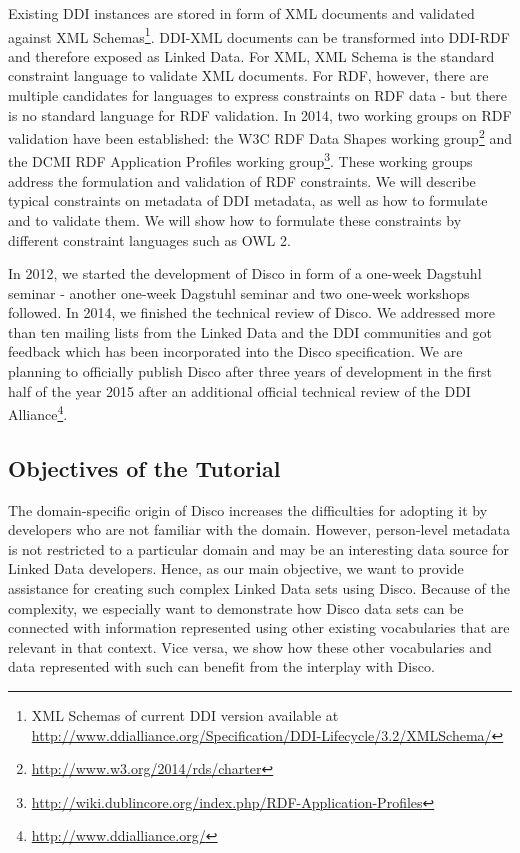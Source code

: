 \documentclass{llncs}
\begin{document}
Existing DDI instances are stored in form of XML documents and validated against XML Schemas\footnote{XML Schemas of current DDI version available at \url{http://www.ddialliance.org/Specification/DDI-Lifecycle/3.2/XMLSchema/}}.
DDI-XML documents can be transformed into DDI-RDF and therefore exposed as Linked Data.
For XML, XML Schema is the standard constraint language to validate XML documents.
For RDF, however, there are multiple candidates for languages to express constraints on RDF data - but there is no standard language for RDF validation.
In 2014, two working groups on RDF validation have been established: the W3C RDF Data Shapes working group\footnote{\url{http://www.w3.org/2014/rds/charter}} and the DCMI RDF Application Profiles working group\footnote{\url{http://wiki.dublincore.org/index.php/RDF-Application-Profiles}}.
These working groups address the formulation and validation of RDF constraints.
We will describe typical constraints on metadata of DDI metadata, as well as how to formulate and to validate them.
We will show how to formulate these constraints by different constraint languages such as OWL 2.

In 2012, we started the development of Disco in form of a one-week Dagstuhl seminar - another one-week Dagstuhl seminar and two one-week workshops followed.  
In 2014, we finished the technical review of Disco.
We addressed more than ten mailing lists from the Linked Data and the DDI communities and got feedback which has been incorporated into the Disco specification.
We are planning to officially publish Disco after three years of development in the first half of the year 2015 after an additional official technical review of the DDI Alliance\footnote{\url{http://www.ddialliance.org/}}.

\subsection{Objectives of the Tutorial} 
The domain-specific origin of Disco increases the difficulties for adopting it by developers who are not familiar with the domain. However, person-level metadata is not restricted to a particular domain and may be an interesting data source for Linked Data developers. Hence, as our main objective, we want to provide assistance for creating such complex Linked Data sets using Disco. Because of the complexity, we especially want to demonstrate how Disco data sets can be connected with information represented using other existing vocabularies that are relevant in that context. Vice versa, we show how these other vocabularies and data represented with such can benefit from the interplay with Disco.
\end{document}
